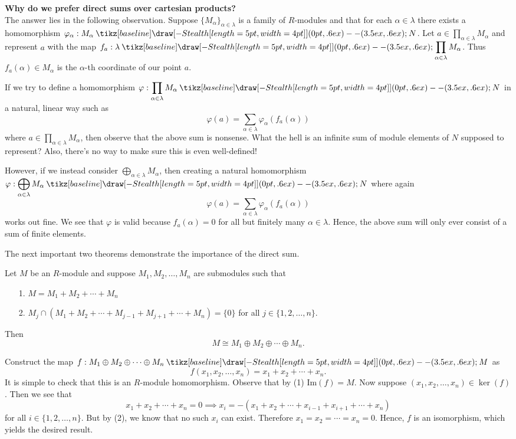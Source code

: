 \documentclass[12pt,letterpaper]{algebra_book}
\renewcommand{\to}{\mathbin{\tikz[baseline] \draw[-{Stealth[length=5pt,width=4pt]}] (0pt,.6ex) -- (3.5ex,.6ex);}}
\newcommand{\im}{\mbox{Im}}
\renewcommand{\phi}{\varphi}
\theoremstyle{definition}
\begin{document}
\noindent\textbf{Why do we prefer direct sums over cartesian products?} 
\\

The answer lies in the following observation. Suppose
$\{M_{\alpha}\}_{\alpha \in \lambda}$ is a family of $R$-modules and
that for each $\alpha \in \lambda$ there exists a homomorphism
$\phi_\alpha : M_\alpha \to N$. Let $a \in \displaystyle
\prod_{\alpha \in \lambda}M_\alpha$ and represent $a$ with the map
$f_a:\lambda \to \displaystyle \prod_{\alpha \in
\lambda}M_{\alpha}$. Thus $f_a(\alpha) \in M_\alpha$ is the $\alpha$-th
coordinate of our point $a$.

If we try to define
a homomorphism $\displaystyle \phi : \prod_{\alpha \in
\lambda}M_\alpha \to N$ in a natural, linear way such as 
\[
    \phi(a) = \sum_{\alpha \in \lambda}\phi_\alpha(f_a(\alpha))
\]
where $\displaystyle a \in \prod_{\alpha \in \lambda}M_{\alpha}$,
then observe that the above sum is nonsense. What the hell is an
infinite sum of module elements of $N$ supposed to represent?
Also, there's no way to make sure this is even well-defined!

However, if we instead consider $\displaystyle \bigoplus_{\alpha
\in \lambda}M_{\alpha}$, then creating a natural homomorphism
$\displaystyle \phi: \bigoplus_{\alpha \in 
\lambda}M_{\alpha} \to N$ where again 
\[
    \phi(a) = \sum_{\alpha \in \lambda}\phi_\alpha(f_a(\alpha))
\]
works out fine. We see that $\phi$ is valid because $f_a(\alpha) =
0$ for all but finitely many $\alpha \in \lambda$. Hence, the
above sum will only ever consist of a sum of finite elements.

The next important two theorems demonstrate the importance of the
direct sum.

\begin{thm}\label{fin_module_sums}
    Let $M$ be an $R$-module and suppose $M_1, M_2, \dots, M_n$
    are submodules such that 
    \begin{itemize}
        \item[1.] $M = M_1 + M_2 + \cdots + M_n$
        \item[2.] $M_j \cap (M_1 + M_2 + \cdots + M_{j-1} + M_{j +
        1} + \cdots + M_n) = \{0\}$ for all $j \in \{1, 2, \dots,
        n\}$. 
    \end{itemize}
    Then 
    \[
        M \cong M_1 \oplus M_2 \oplus \cdots \oplus M_n.
    \]
    \vspace{-0.8cm}
\end{thm}

\begin{prf}
    Construct the map $f:M_1 \oplus M_2 \oplus
    \cdots \oplus M_n \to M$ as 
    \[
        f(x_1, x_2, \dots, x_n) = x_1 + x_2 + \cdots + x_n.
    \]
    It is simple to check that this is an $R$-module homomorphism.
    Observe that by (1) $\im(f) = M$. Now suppose $(x_1, x_2, \dots, x_n) \in \ker(f)$. Then
    we see that 
    \[
        x_1 + x_2 + \cdots + x_n = 0 \implies x_i = -(x_1 + x_2 + \cdots + x_{i-1} + x_{i+1} + \cdots + x_n)
    \]
    for all $i \in \{1, 2, \dots, n\}$. But by (2), we know that
    no such $x_i$ can exist. Therefore $x_1 = x_2 = \cdots = x_n =
    0$. Hence, $f$ is an isomorphism, which yields the desired result.
\end{prf}
\end{document}

